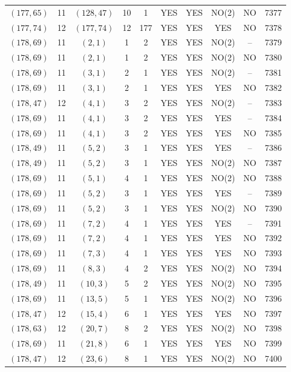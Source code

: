 \begin{longtable}{|c|c|c|c|c|c|c|c|c|c|}
$(177, 65)$ & 11 & $(128, 47)$ & 10 & 1 & YES & YES & NO(2) & NO & 7377\\
$(177, 74)$ & 12 & $(177, 74)$ & 12 & 177 & YES & YES & YES & NO & 7378\\
$(178, 69)$ & 11 & $(2, 1)$ & 1 & 2 & YES & YES & NO(2) & -- & 7379\\
$(178, 69)$ & 11 & $(2, 1)$ & 1 & 2 & YES & YES & NO(2) & NO & 7380\\
$(178, 69)$ & 11 & $(3, 1)$ & 2 & 1 & YES & YES & NO(2) & -- & 7381\\
$(178, 69)$ & 11 & $(3, 1)$ & 2 & 1 & YES & YES & YES & NO & 7382\\
$(178, 47)$ & 12 & $(4, 1)$ & 3 & 2 & YES & YES & NO(2) & -- & 7383\\
$(178, 69)$ & 11 & $(4, 1)$ & 3 & 2 & YES & YES & YES & -- & 7384\\
$(178, 69)$ & 11 & $(4, 1)$ & 3 & 2 & YES & YES & YES & NO & 7385\\
$(178, 49)$ & 11 & $(5, 2)$ & 3 & 1 & YES & YES & YES & -- & 7386\\
$(178, 49)$ & 11 & $(5, 2)$ & 3 & 1 & YES & YES & NO(2) & NO & 7387\\
$(178, 69)$ & 11 & $(5, 1)$ & 4 & 1 & YES & YES & NO(2) & NO & 7388\\
$(178, 69)$ & 11 & $(5, 2)$ & 3 & 1 & YES & YES & YES & -- & 7389\\
$(178, 69)$ & 11 & $(5, 2)$ & 3 & 1 & YES & YES & NO(2) & NO & 7390\\
$(178, 69)$ & 11 & $(7, 2)$ & 4 & 1 & YES & YES & YES & -- & 7391\\
$(178, 69)$ & 11 & $(7, 2)$ & 4 & 1 & YES & YES & YES & NO & 7392\\
$(178, 69)$ & 11 & $(7, 3)$ & 4 & 1 & YES & YES & YES & NO & 7393\\
$(178, 69)$ & 11 & $(8, 3)$ & 4 & 2 & YES & YES & NO(2) & NO & 7394\\
$(178, 49)$ & 11 & $(10, 3)$ & 5 & 2 & YES & YES & NO(2) & NO & 7395\\
$(178, 69)$ & 11 & $(13, 5)$ & 5 & 1 & YES & YES & NO(2) & NO & 7396\\
$(178, 47)$ & 12 & $(15, 4)$ & 6 & 1 & YES & YES & YES & NO & 7397\\
$(178, 63)$ & 12 & $(20, 7)$ & 8 & 2 & YES & YES & NO(2) & NO & 7398\\
$(178, 69)$ & 11 & $(21, 8)$ & 6 & 1 & YES & YES & YES & NO & 7399\\
$(178, 47)$ & 12 & $(23, 6)$ & 8 & 1 & YES & YES & NO(2) & NO & 7400\\

\end{longtable}

